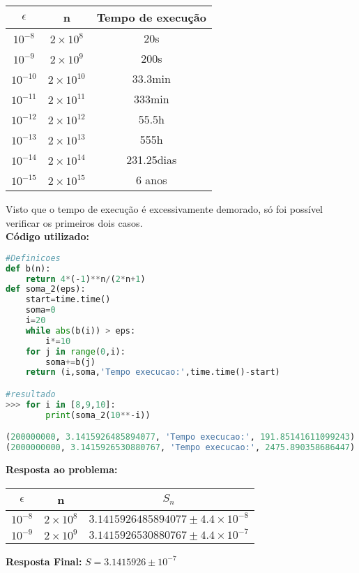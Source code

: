\documentclass{article}
\begin{document}
\begin{center}\begin{tabular}{|c|c|c|}
  \hline
  $\epsilon$ & n & Tempo de execução\\
  \hline
  $10^{-8}$ & $2\times10^8$ & 20s\\
  \hline
  $10^{-9}$ & $2\times10^9$ & 200s\\
  \hline
  $10^{-10}$ & $2\times10^{10}$ & 33.3min\\
  \hline
  $10^{-11}$ & $2\times10^{11}$ & 333min\\
  \hline
  $10^{-12}$ & $2\times10^{12}$ & 55.5h\\
  \hline
  $10^{-13}$ & $2\times10^{13}$ & 555h\\
  \hline
  $10^{-14}$ & $2\times10^{14}$ & 231.25dias\\
  \hline
  $10^{-15}$ & $2\times10^{15}$ & 6 anos\\
  \hline
\end{tabular}
\end{center}
Visto que o tempo de execução é excessivamente demorado, só foi possível verificar os primeiros dois casos.\\[5mm]
\textbf{Código utilizado:}
\begin{lstlisting}[language = Python]
#Definicoes
def b(n):
    return 4*(-1)**n/(2*n+1)
def soma_2(eps):
    start=time.time()
    soma=0
    i=20
    while abs(b(i)) > eps:
        i*=10
    for j in range(0,i):
        soma+=b(j)
    return (i,soma,'Tempo execucao:',time.time()-start)

#resultado
>>> for i in [8,9,10]:
    	print(soma_2(10**-i))

(200000000, 3.1415926485894077, 'Tempo execucao:', 191.85141611099243)
(2000000000, 3.1415926530880767, 'Tempo execucao:', 2475.890358686447)
\end{lstlisting}
\newpage
\textbf{Resposta ao problema:}
\begin{center}
\begin{tabular}{|c|c|c|}
  \hline
  $\epsilon$ & n  & $S_n$\\
  \hline
  $10^{-8}$ & $2\times 10^{8}$ & $3.1415926485894077 \pm 4.4\times10^{-8}$\\
  \hline
  $10^{-9}$ & $2\times 10^{9}$ & $3.1415926530880767 \pm 4.4\times10^{-7}$\\
  \hline
\end{tabular}
\end{center}
\begin{center}
  \textbf{Resposta Final:} $S = 3.1415926 \pm 10^{-7}$
\end{center}
\end{document}
